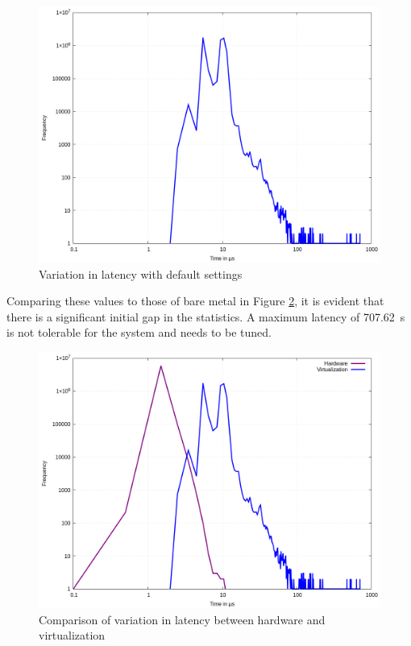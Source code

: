\documentclass[MMR,Master,english]{twbook}
\begin{document}
\begin{figure}[H]
	\centering
	\includegraphics[width=0.7\columnwidth]{masterthesis-documentation/docs/sigmatek/xenomai/1default/gnuplot_max_latency_default.png}
	\caption[Variation in latency with default settings]{Variation in latency with default settings}
	\label{fig:gnuplot_max_latency_default}
\end{figure}


\noindent Comparing these values to those of bare metal in Figure \ref{fig:gnuplot_max_latency_combined}, it is evident that there is a significant initial gap in the statistics. A maximum latency of 707.62~\textmu s is not tolerable for the system and needs to be tuned. 

\begin{figure}[H]
	\centering
	\includegraphics[width=0.7\columnwidth]{masterthesis-documentation/docs/sigmatek/xenomai/01combined/gnuplot_combined_max_latency.png}
	\caption[Comparison of variation in latency between hardware and virtualization]{Comparison of variation in latency between hardware and virtualization}
	\label{fig:gnuplot_max_latency_combined}
\end{figure}
\end{document}
